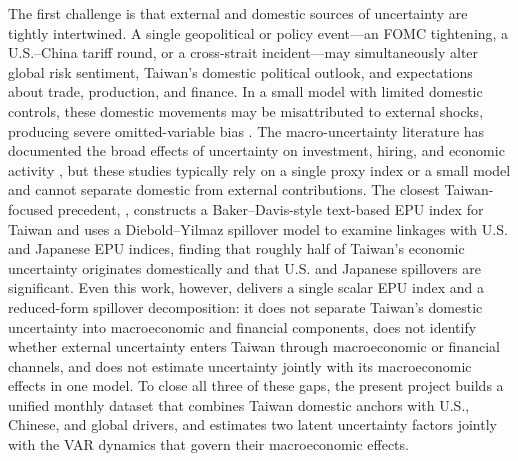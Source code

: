 \documentclass[12pt]{article}
\begin{document}
The first challenge is that external and domestic sources of uncertainty are tightly intertwined. A single geopolitical or policy event---an FOMC tightening, a U.S.--China tariff round, or a cross-strait incident---may simultaneously alter global risk sentiment, Taiwan's domestic political outlook, and expectations about trade, production, and finance. In a small model with limited domestic controls, these domestic movements may be misattributed to external shocks, producing severe omitted-variable bias \citep{carriero2018measuring}. The macro-uncertainty literature has documented the broad effects of uncertainty on investment, hiring, and economic activity \citep{bloom2009impact,bloom2014fluctuations,baker2016measuring,handley2022tpu}, but these studies typically rely on a single proxy index or a small model and cannot separate domestic from external contributions. The closest Taiwan-focused precedent, \citet{huang2021taiwan}, constructs a Baker--Davis-style text-based EPU index for Taiwan and uses a Diebold--Yilmaz spillover model to examine linkages with U.S. and Japanese EPU indices, finding that roughly half of Taiwan's economic uncertainty originates domestically and that U.S. and Japanese spillovers are significant. Even this work, however, delivers a single scalar EPU index and a reduced-form spillover decomposition: it does not separate Taiwan's domestic uncertainty into macroeconomic and financial components, does not identify whether external uncertainty enters Taiwan through macroeconomic or financial channels, and does not estimate uncertainty jointly with its macroeconomic effects in one model. To close all three of these gaps, the present project builds a unified monthly dataset that combines Taiwan domestic anchors with U.S., Chinese, and global drivers, and estimates two latent uncertainty factors jointly with the VAR dynamics that govern their macroeconomic effects.
\end{document}
